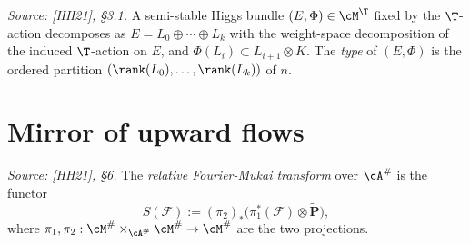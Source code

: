 \begin{definition}
  \label{def:T_fixed_type}
  \textit{Source: [HH21], §3.1.}
  A semi-stable Higgs bundle \((E, \Phi) \in \cM^{\T}\) fixed by the \(\T\)-action decomposes
  as \(E = L_0 \oplus \cdots \oplus L_k\) with the weight-space decomposition of the induced
  \(\T\)-action on \(E\), and \(\Phi(L_i) \subset L_{i+1} \otimes K\).  The \emph{type} of
  \((E,\Phi)\) is the ordered partition \((\rank(L_0), \ldots, \rank(L_k))\) of \(n\).
\end{definition}

\section{Mirror of upward flows}

\begin{definition}
  \label{def:fourier_mukai_transform}
  \textit{Source: [HH21], §6.}
  The \emph{relative Fourier-Mukai transform} over \(\cA^{\#}\) is the functor
  \[
    S(\mathcal{F}) := (\pi_2)_*\!\bigl(\pi_1^*(\mathcal{F}) \otimes \widetilde{\mathbf{P}}\bigr),
  \]
  where \(\pi_1, \pi_2 : \cM^{\#} \times_{\cA^{\#}} \cM^{\#} \to \cM^{\#}\) are the two
  projections.
\end{definition}
